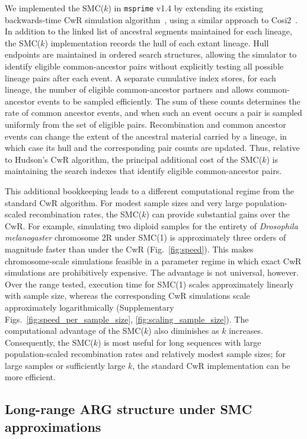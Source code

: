 \documentclass[9pt,twocolumn,twoside,lineno]{gsajnl}
\begin{document}
We implemented the SMC($k$) in \texttt{msprime} v1.4 by extending its existing
backwards-time CwR simulation algorithm~\citep{kelleher_efficient_2016},
using a similar approach to Cosi2~\citep{shlyakhter_cosi2_2014}.
In addition to the linked list of ancestral segments maintained for each lineage,
the SMC($k$) implementation records the hull of each extant lineage.
Hull endpoints are maintained in ordered search structures, allowing the simulator
to identify eligible common-ancestor pairs without explicitly testing all
possible lineage pairs after each event. A separate cumulative index stores,
for each lineage, the number of eligible common-ancestor partners and allows
common-ancestor events to be sampled efficiently.
The sum of these counts determines the rate of common ancestor events, and when
such an event occurs a pair is sampled uniformly from the set of eligible
pairs. Recombination and common ancestor events can change the extent of the
ancestral material carried by a lineage, in which case its hull and the
corresponding pair counts are updated. Thus, relative to Hudson's CwR
algorithm, the principal additional cost of the SMC($k$) is maintaining the search
indexes that identify eligible common-ancestor pairs.

This additional bookkeeping leads to a different computational regime from the
standard CwR algorithm. For modest sample sizes and very large
population-scaled recombination rates, the SMC($k$) can provide substantial gains
over the CwR.
For example, simulating two diploid samples for the entirety of
\emph{Drosophila melanogaster} chromosome 2R under
SMC(1) is approximately three orders of magnitude faster than under the CwR
(Fig.~\ref{fig:speed}). This makes chromosome-scale simulations feasible in a
parameter regime in which exact CwR simulations are prohibitively expensive.
The advantage is not universal, however.
Over the range tested,
execution time for
SMC(1) scales approximately linearly with sample size, whereas the
corresponding CwR simulations scale approximately logarithmically
(Supplementary Figs.~\ref{fig:speed_per_sample_size}, \ref{fig:scaling_sample_size}).
The computational advantage of the SMC($k$) also diminishes as $k$ increases.
Consequently, the SMC($k$) is most useful for long sequences with large
population-scaled recombination rates and relatively modest sample sizes; for
large samples or sufficiently large $k$, the standard CwR implementation can
be more efficient.

\subsection{Long-range ARG structure under SMC approximations}
\end{document}
